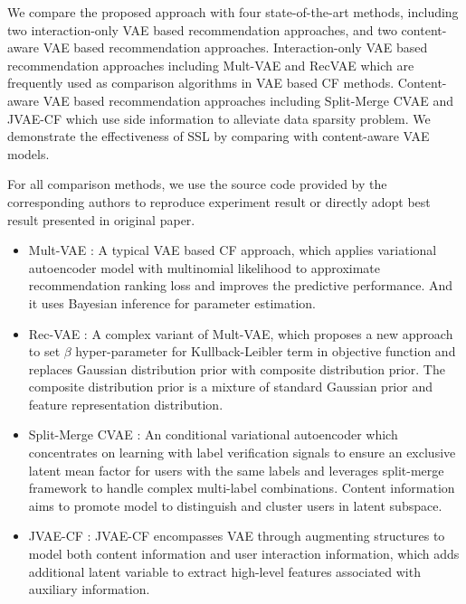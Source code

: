 We compare the proposed approach with four state-of-the-art methods, including two interaction-only VAE based recommendation approaches, and two content-aware VAE based recommendation approaches. Interaction-only VAE based recommendation approaches including Mult-VAE and RecVAE which are frequently used as comparison algorithms in VAE based CF methods. Content-aware VAE based recommendation approaches including  Split-Merge CVAE and JVAE-CF which use side information to alleviate data sparsity problem. We demonstrate the effectiveness of SSL by comparing with content-aware VAE models.




For all comparison methods, we use the source code provided by the corresponding authors to reproduce experiment result or directly adopt best result presented in original paper.


\begin{itemize}
\item Mult-VAE \cite{DBLP:conf/www/LiangKHJ18}: A typical VAE based CF approach, which applies variational autoencoder model with multinomial likelihood to approximate recommendation ranking loss and improves the predictive performance. And it uses Bayesian inference for parameter estimation.

\item Rec-VAE \cite{DBLP:conf/wsdm/ShenbinATMN20}: A complex variant of Mult-VAE, which proposes a new approach to set $\beta$ hyper-parameter for Kullback-Leibler term in objective function and replaces Gaussian distribution prior with composite distribution prior. The composite distribution prior is a mixture of standard Gaussian prior and feature representation distribution.  


\item Split-Merge CVAE \cite{DBLP:conf/pakdd/PangYW19}: An conditional variational autoencoder which concentrates on
learning with label verification signals to ensure an exclusive latent mean factor for users with the same labels and leverages split-merge framework to handle complex multi-label combinations. Content information aims to promote model to distinguish and cluster users in latent subspace.

\item JVAE-CF \cite{DBLP:conf/cikm/LeeSM17}: JVAE-CF encompasses VAE through augmenting structures to model both content information and user interaction information, which adds additional latent variable to extract high-level features associated with auxiliary information.
\end{itemize}


